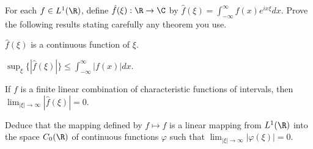For each $f\in L^1(\R)$, define $\hat{f}(\xi):\R\rightarrow \C$ by
$\hat{f}(\xi)=\int_{-\infty}^{\infty}f(x)e^{ix\xi}dx$. Prove the
following results stating carefully any theorem you use.
\begin{alist}
\item $\hat{f}(\xi)$ is a continuous function of $\xi$.
\item $\sup_{\xi}\{|\hat{f}(\xi)|\}\leq
\int_{-\infty}^{\infty}|f(x)|dx$.
\item If $f$ is a finite linear combination of characteristic functions
of intervals, then $\lim_{|\xi|\rightarrow
\infty}|\hat{f}(\xi)|=0$. 
\end{alist}
Deduce that the mapping defined by $f\mapsto \hat{f}$ is a linear
mapping from $L^1(\R)$ into the space $C_0(\R)$ of continuous
functions $\varphi$ such that $\lim_{|\xi|\rightarrow
\infty}|\varphi(\xi)|=0$.
